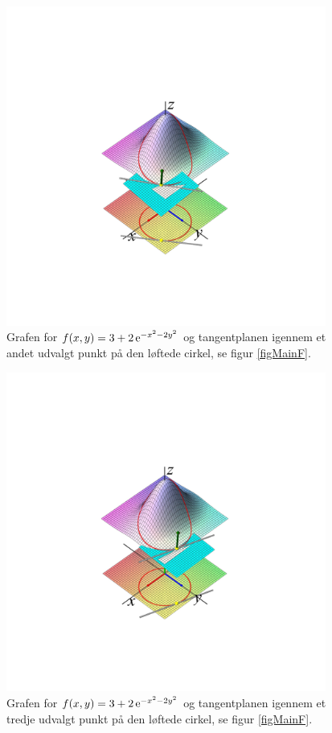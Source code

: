 \begin{figure}[ht]
\centerline{\includegraphics[height=105mm]{plotTangFull02B.pdf} }
\begin{center}
\caption{Grafen for $f(x,y) = 3 +  2\,\mathrm{e}^{-x^{2} - 2y^{2}}$  og tangentplanen igennem et andet udvalgt punkt på den løftede cirkel, se figur \ref{figMainF}.} \label{figMainFTplanerB}
\end{center}
\end{figure}


\begin{figure}[ht]
\centerline{\includegraphics[height=105mm]{plotTangFull04B.pdf}}
\begin{center}
\caption{Grafen for $f(x,y) = 3 +  2\,\mathrm{e}^{-x^{2} - 2y^{2}}$  og tangentplanen igennem et tredje udvalgt punkt på den løftede cirkel, se figur \ref{figMainF}.} \label{figMainFTplanerC}
\end{center}
\end{figure}





